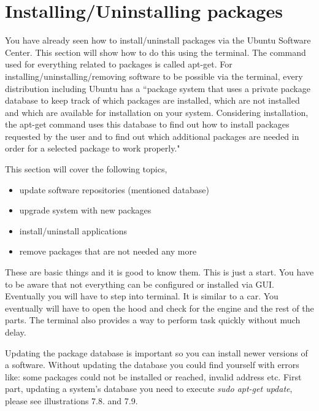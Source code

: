 \section{Installing/Uninstalling packages} 
You have already  seen how to install/uninstall packages via the Ubuntu Software Center. This section will show how to do this using the terminal. The command used for everything related to packages is called apt-get. For installing/uninstalling/removing software to be possible via the terminal, every distribution including Ubuntu has a ``package system that uses a private package database to keep track of which packages are installed, which are not installed and which are available for installation on your system. Considering installation, the apt-get command uses this database to find out how to install packages requested by the user and to find out which additional packages are needed in order for a selected package to work properly." \\

\par \noindent This section will cover the following topics,

\begin{itemize}
	\item update software repositories (mentioned database)
	\item upgrade system with new packages
	\item install/uninstall applications
	\item remove packages that are not needed any more
\end{itemize}

\par \noindent These are basic things and it is good to know them. This is just a start. You have to be aware that not everything can be configured or installed via GUI. Eventually you will have to step into terminal. It is similar to a car. You eventually will have to open the hood and check for the engine and the rest of the parts. The terminal also provides a way to perform task quickly without much delay.\\

\par \noindent Updating the package database is important so you can install newer versions of a software.  Without updating the database you could find yourself with errors like: some packages could not be installed or reached, invalid address etc. First part, updating a system's database you need to execute \textit{sudo apt-get update},  please see illustrations 7.8. and 7.9. \\

